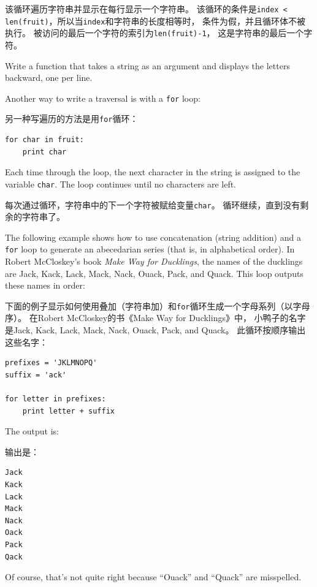 \documentclass[10pt]{book}
\begin{document}
\begin{CJK}{UTF8}{gbsn}
该循环遍历字符串并显示在每行显示一个字符串。
该循环的条件是{\tt index < len(fruit)}，所以当{\tt index}和字符串的长度相等时，
条件为假，并且循环体不被执行。
被访问的最后一个字符的索引为{\tt len(fruit)-1}，
这是字符串的最后一个字符。

\begin{exercise}

Write a function that takes a string as an argument
and displays the letters backward, one per line.

\end{exercise}

Another way to write a traversal is with a {\tt for} loop:

另一种写遍历的方法是用{\tt for}循环：

\begin{verbatim}
for char in fruit:
    print char
\end{verbatim}
%
Each time through the loop, the next character in the string is assigned
to the variable {\tt char}.  The loop continues until no characters are
left.

每次通过循环，字符串中的下一个字符被赋给变量{\tt char}。
循环继续，直到没有剩余的字符串了。

The following example shows how to use concatenation (string addition)
and a {\tt for} loop to generate an abecedarian series (that is, in
alphabetical order).  In Robert McCloskey's book {\em Make
Way for Ducklings}, the names of the ducklings are Jack, Kack, Lack,
Mack, Nack, Ouack, Pack, and Quack.  This loop outputs these names in
order:

下面的例子显示如何使用叠加（字符串加）和{\tt for}循环生成一个字母系列（以字母序）。
在Robert McCloskey的书《Make Way for Ducklings》中，
小鸭子的名字是Jack, Kack, Lack, Mack, Nack, Ouack, Pack, and Quack。
此循环按顺序输出这些名字：

\begin{verbatim}
prefixes = 'JKLMNOPQ'
suffix = 'ack'

for letter in prefixes:
    print letter + suffix
\end{verbatim}
%
The output is:

输出是：

\begin{verbatim}
Jack
Kack
Lack
Mack
Nack
Oack
Pack
Qack
\end{verbatim}
%
Of course, that's not quite right because ``Ouack'' and
``Quack'' are misspelled.


\end{CJK}
\end{document}
